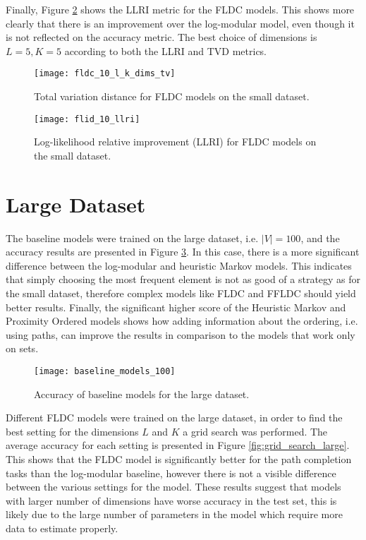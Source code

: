 Finally, Figure \ref{fig:small_llri} shows the LLRI metric for the FLDC models. This shows more clearly that there is an improvement over the log-modular model, even though it is not reflected on the accuracy metric. The best choice of dimensions is $L=5,K=5$ according to both the LLRI and TVD metrics.

\begin{figure}
  \centering
  \texttt{[image: fldc\_10\_l\_k\_dims\_tv]}
  \caption{Total variation distance for FLDC models on the small dataset.}
  \label{fig:small_tv_comparison}
\end{figure}

\begin{figure}
  \centering
  \texttt{[image: flid\_10\_llri]}
  \caption{Log-likelihood relative improvement (LLRI) for FLDC models on the small dataset.}
  \label{fig:small_llri}
\end{figure}

\section{Large Dataset}

The baseline models were trained on the large dataset, i.e. $|V| = 100$, and the accuracy results are presented in Figure \ref{fig:large_baselines}. In this case, there is a more significant difference between the log-modular and heuristic Markov models. This indicates that simply choosing the most frequent element is not as good of a strategy as for the small dataset, therefore complex models like FLDC and FFLDC should yield better results. Finally, the significant higher score of the Heuristic Markov and Proximity Ordered models shows how adding information about the ordering, i.e. using paths, can improve the results in comparison to the models that work only on sets.

\begin{figure}
  \centering
  \texttt{[image: baseline\_models\_100]}
  \caption{Accuracy of baseline models for the large dataset.}
  \label{fig:large_baselines}
\end{figure}

Different FLDC models were trained on the large dataset, in order to find the best setting for the dimensions $L$ and $K$ a grid search was performed. The average accuracy for each setting is presented in Figure \ref{fig:grid_search_large}. This shows that the FLDC model is significantly better for the path completion tasks than the log-modular baseline, however there is not a visible difference between the various settings for the model. These results suggest that models with larger number of dimensions have worse accuracy in the test set, this is likely due to the large number of parameters in the model which require more data to estimate properly.

